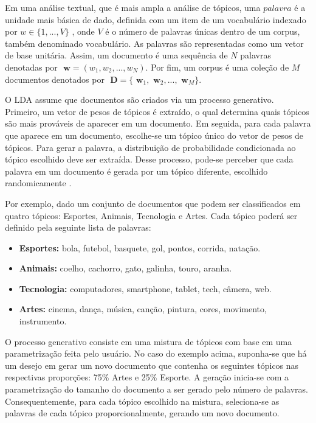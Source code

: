 \documentclass[12pt,a4paper]{article}
\begin{document}
Em uma análise textual, que é mais ampla a análise de  tópicos, uma $palavra$ é a unidade mais básica de dado, definida com um item de um vocabulário indexado por \(w \in \{1,. . . , V\}\)  , onde $V$ é o número de palavras únicas dentro de um corpus, também denominado vocabulário. As palavras são representadas como um vetor de base unitária. Assim, um documento é uma sequência de $N$ palavras denotadas por \(\textbf{ w} = (w_1, w_2,. . . ,  w_N)\). Por fim, um corpus é uma coleção de $M$ documentos denotados por \(\textbf{ D} = \{\textbf{ w}_1, \textbf{ w}_2, . . ., \textbf{ w}_M\}\).

 O LDA assume que documentos são criados via um processo generativo. Primeiro, um vetor de pesos de tópicos é extraído, o qual determina
 quais tópicos são mais prováveis de aparecer em um documento. Em seguida, para cada palavra que aparece em um documento, escolhe-se um tópico
 único do vetor de pesos de tópicos. Para gerar a palavra, a distribuição de probabilidade condicionada ao tópico escolhido deve ser extraída.
 Desse processo, pode-se perceber que cada palavra em um documento é gerada por um tópico diferente, escolhido randomicamente \cite{hu2009latent}.

 Por exemplo, dado um conjunto de documentos que podem ser classificados em quatro tópicos: Esportes, Animais, Tecnologia e Artes. 
 Cada tópico poderá ser definido pela seguinte lista de palavras:

\begin{itemize}
  \item \textbf{ Esportes:} bola, futebol, basquete, gol, pontos, corrida, natação.
  \item \textbf{ Animais:} coelho, cachorro, gato, galinha, touro, aranha.
  \item \textbf{ Tecnologia:} computadores, smartphone, tablet, tech, câmera, web.
  \item \textbf{ Artes:} cinema, dança, música, canção, pintura, cores, movimento, instrumento.
\end{itemize}

O processo generativo consiste em uma mistura de tópicos com base em uma parametrização feita pelo usuário. No caso do exemplo acima, suponha-se que há um desejo em gerar um novo documento que contenha os seguintes tópicos nas respectivas proporções: 75\% Artes e 25\% Esporte. A geração inicia-se com a parametrização do tamanho do documento a ser gerado pelo número de palavras. Consequentemente, para cada tópico escolhido na mistura, seleciona-se as palavras de cada tópico proporcionalmente, gerando um novo documento.
\end{document}
